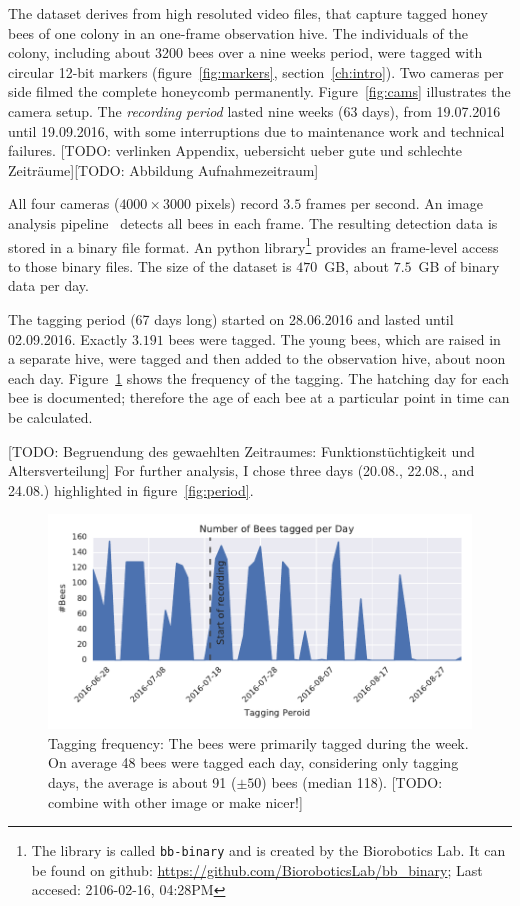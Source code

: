 The dataset derives from high resoluted video files, that capture tagged honey bees of one colony in an one-frame observation hive.
The individuals of the colony, including about 3200 bees over a nine weeks period, were tagged with circular 12-bit markers (figure~\ref{fig:markers}, section~\ref{ch:intro}).
Two cameras per side filmed the complete honeycomb permanently.
Figure~\ref{fig:cams} illustrates the camera setup.
The \emph{recording period} lasted nine weeks (63 days), from 19.07.2016 until 19.09.2016, with some interruptions due to maintenance work and technical failures. [TODO: verlinken Appendix, uebersicht ueber gute und schlechte Zeiträume][TODO: Abbildung Aufnahmezeitraum]

All four cameras ($4000\times3000$ pixels) record $3.5$ frames per second. 
An image analysis pipeline~\cite{wario2015automatic} detects all bees in each frame.
The resulting detection data is stored in a binary file format.
An python library\footnote{The library is called \texttt{bb-binary} and is created by the Biorobotics Lab. It can be found on github: \url{https://github.com/BioroboticsLab/bb_binary}; Last accesed: 2106-02-16, 04:28PM} provides an frame-level access to those binary files.
The size of the dataset is $470$~GB, about $7.5$~GB of binary data per day.

The tagging period (67 days long) started on 28.06.2016 and lasted until 02.09.2016. Exactly $3.191$ bees were tagged. The young bees, which are raised in a separate hive, were tagged and then added to the observation hive, about noon each day. Figure~\ref{fig:tagging} shows the frequency of the tagging. The hatching day for each bee is documented; therefore the age of each bee at a particular point in time can be calculated.

[TODO: Begruendung des gewaehlten Zeitraumes: Funktionstüchtigkeit und Altersverteilung]
For further analysis, I chose three days (20.08., 22.08., and 24.08.) highlighted in figure~\ref{fig:period}.

\begin{figure}[htb]
	\centering
	\includegraphics[width=1.0\textwidth]{Figures/tagging_period}
	\caption[Tagging frequency]{Tagging frequency: The bees were primarily tagged during the week. On average 48 bees were tagged each day, considering only tagging days, the average is about 91 ($\pm50$) bees (median 118). [TODO: combine with other image or make nicer!]}
	\label{fig:tagging}
\end{figure}

